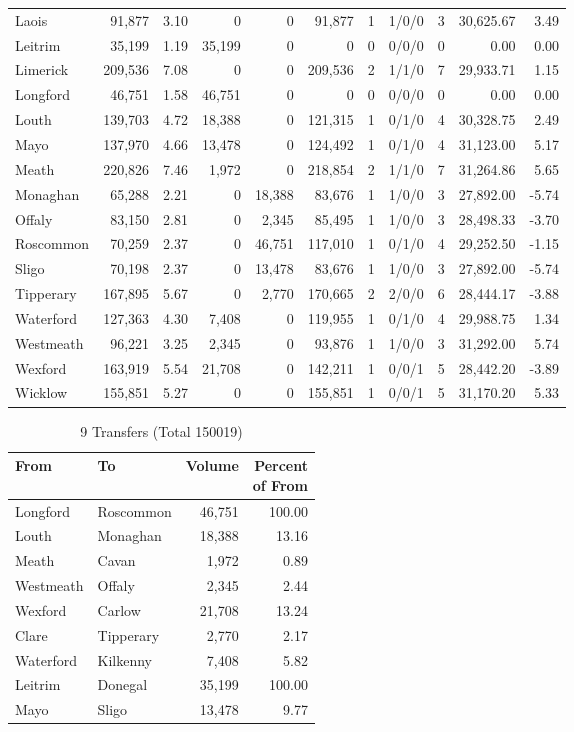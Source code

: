 \documentclass[a4paper]{article}
\begin{document}
\begin{longtable}{lrrrrrrlrrr}
Laois&91,877& 3.10&0&0&91,877&1&1/0/0&3&30,625.67& 3.49\\ 
Leitrim&35,199& 1.19&35,199&0&0&0&0/0/0&0& 0.00& 0.00\\ 
Limerick&209,536& 7.08&0&0&209,536&2&1/1/0&7&29,933.71& 1.15\\ 
Longford&46,751& 1.58&46,751&0&0&0&0/0/0&0& 0.00& 0.00\\ 
Louth&139,703& 4.72&18,388&0&121,315&1&0/1/0&4&30,328.75& 2.49\\ 
Mayo&137,970& 4.66&13,478&0&124,492&1&0/1/0&4&31,123.00& 5.17\\ 
Meath&220,826& 7.46&1,972&0&218,854&2&1/1/0&7&31,264.86& 5.65\\ 
Monaghan&65,288& 2.21&0&18,388&83,676&1&1/0/0&3&27,892.00&-5.74\\ 
Offaly&83,150& 2.81&0&2,345&85,495&1&1/0/0&3&28,498.33&-3.70\\ 
Roscommon&70,259& 2.37&0&46,751&117,010&1&0/1/0&4&29,252.50&-1.15\\ 
Sligo&70,198& 2.37&0&13,478&83,676&1&1/0/0&3&27,892.00&-5.74\\ 
Tipperary&167,895& 5.67&0&2,770&170,665&2&2/0/0&6&28,444.17&-3.88\\ 
Waterford&127,363& 4.30&7,408&0&119,955&1&0/1/0&4&29,988.75& 1.34\\ 
Westmeath&96,221& 3.25&2,345&0&93,876&1&1/0/0&3&31,292.00& 5.74\\ 
Wexford&163,919& 5.54&21,708&0&142,211&1&0/0/1&5&28,442.20&-3.89\\ 
Wicklow&155,851& 5.27&0&0&155,851&1&0/0/1&5&31,170.20& 5.33\\ 
\end{longtable}

\begin{table}[htbp]
\caption{9 Transfers (Total 150019)}
\centering
\begin{tabular}{llrr} \toprule
From &To &Volume &\shortstack{Percent\\of From} \\ \midrule
Longford&Roscommon&46,751&100.00\\ 
Louth&Monaghan&18,388&13.16\\ 
Meath&Cavan&1,972& 0.89\\ 
Westmeath&Offaly&2,345& 2.44\\ 
Wexford&Carlow&21,708&13.24\\ 
Clare&Tipperary&2,770& 2.17\\ 
Waterford&Kilkenny&7,408& 5.82\\ 
Leitrim&Donegal&35,199&100.00\\ 
Mayo&Sligo&13,478& 9.77\\ 
\bottomrule
\end{tabular}
\end{table}
\end{document}

